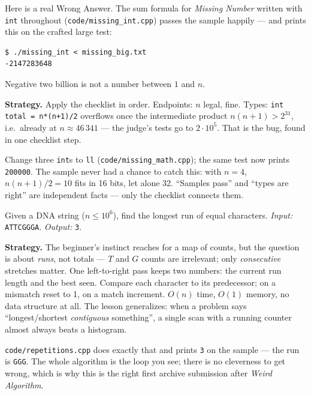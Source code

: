 \begin{example}
\label{ex:bughunt}
Here is a real Wrong Answer. The sum formula for \emph{Missing Number}
written with \texttt{int} throughout (\texttt{code/missing\_int.cpp}) passes
the sample happily --- and prints this on the crafted large test:
\begin{lstlisting}[numbers=none]
$ ./missing_int < missing_big.txt
-2147283648
\end{lstlisting}
Negative two billion is not a number between $1$ and $n$.
\par\smallskip
\textbf{Strategy.} Apply the checklist in order. Endpoints: $n$ legal, fine.
Types: \texttt{int total = n*(n+1)/2} overflows once
the intermediate product $n(n+1) > 2^{31}$, i.e.\ already at
$n \approx 46\,341$ --- the judge's tests go to $2\cdot10^5$.
That is the bug, found in one checklist step.
\par\smallskip
\begin{solution}
Change three \texttt{int}s to \texttt{ll} (\texttt{code/missing\_math.cpp});
the same test now prints \texttt{200000}. The sample never had a chance to
catch this: with $n=4$, $n(n+1)/2 = 10$ fits in 16 bits, let alone 32.
``Samples pass'' and ``types are right'' are independent facts --- only the
checklist connects them.
\end{solution}
\end{example}

\begin{example}
\label{ex:rep}
Given a DNA string ($n \le 10^6$), find the longest run of equal
characters. \emph{Input:} \texttt{ATTCGGGA}. \emph{Output:} \texttt{3}.
\par\smallskip
\textbf{Strategy.} The beginner's instinct reaches for a map of counts,
but the question is about \emph{runs}, not totals --- $T$ and $G$ counts
are irrelevant; only \emph{consecutive} stretches matter. One left-to-right
pass keeps two numbers: the current run length and the best seen. Compare
each character to its predecessor; on a mismatch reset to 1, on a match
increment. $O(n)$ time, $O(1)$ memory, no data structure at all. The
lesson generalizes: when a problem says ``longest/shortest
\emph{contiguous} something'', a single scan with a running counter almost
always beats a histogram.
\par\smallskip
\begin{solution}
\texttt{code/repetitions.cpp} does exactly that and prints \texttt{3} on
the sample --- the run is \texttt{GGG}. The whole algorithm is the
loop you see; there is no cleverness to get wrong, which is why this is
the right first archive submission after \emph{Weird Algorithm}.
\end{solution}
\end{example}


